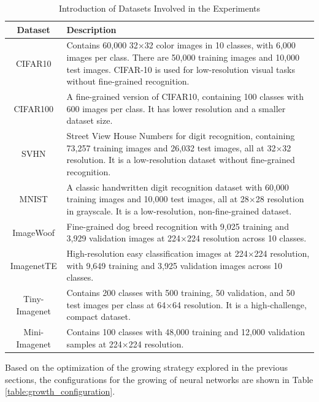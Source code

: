 \documentclass[preprint,12pt]{elsarticle}
\begin{document}
\begin{table}[ht]
\centering
\tiny
\renewcommand{\arraystretch}{1.3}
\begin{adjustbox}{center}
\begin{tabular}{c|p{10cm}}
\hline
\textbf{Dataset} & \textbf{Description} \\
\hline
CIFAR10 \cite{cifar} & Contains 60,000 32×32 color images in 10 classes, with 6,000 images per class. There are 50,000 training images and 10,000 test images. CIFAR-10 is used for low-resolution visual tasks without fine-grained recognition. \\
\hline
CIFAR100 \cite{cifar} & A fine-grained version of CIFAR10, containing 100 classes with 600 images per class. It has lower resolution and a smaller dataset size. \\
\hline
SVHN \cite{svhn} & Street View House Numbers for digit recognition, containing 73,257 training images and 26,032 test images, all at 32×32 resolution. It is a low-resolution dataset without fine-grained recognition. \\
\hline
MNIST \cite{mnist} & A classic handwritten digit recognition dataset with 60,000 training images and 10,000 test images, all at 28×28 resolution in grayscale. It is a low-resolution, non-fine-grained dataset. \\
\hline
ImageWoof \cite{imagenet} & Fine-grained dog breed recognition with 9,025 training and 3,929 validation images at 224×224 resolution across 10 classes. \\
\hline
ImagenetTE \cite{imagenet} & High-resolution easy classification images at 224×224 resolution, with 9,649 training and 3,925 validation images across 10 classes. \\
\hline
Tiny-Imagenet \cite{imagenet} & Contains 200 classes with 500 training, 50 validation, and 50 test images per class at 64×64 resolution. It is a high-challenge, compact dataset. \\
\hline
Mini-Imagenet \cite{imagenet} & Contains 100 classes with 48,000 training and 12,000 validation samples at 224×224 resolution. \\
\hline
\end{tabular}
\end{adjustbox}
\caption{Introduction of Datasets Involved in the Experiments}
\label{table:datasets}
\end{table}

Based on the optimization of the growing strategy explored in the previous sections, the configurations for the growing of neural networks are shown in Table \ref{table:growth_configuration}.
\end{document}
